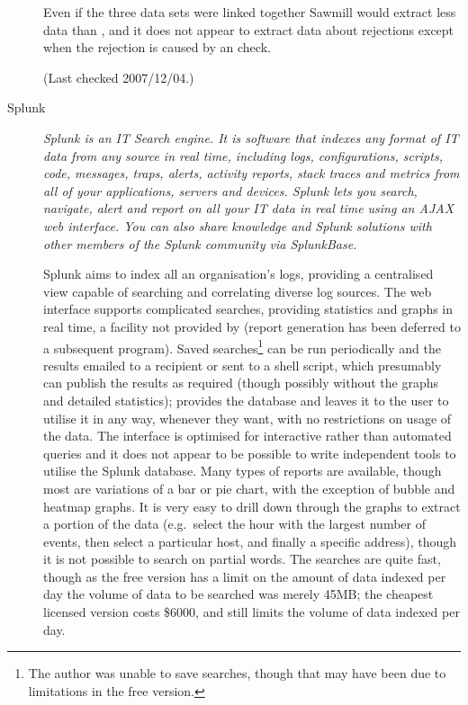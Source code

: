 \documentclass[a4paper,12pt,draft]{article}
\newcommand{\parsername}{\PLP{}}
\begin{document}
\begin{description}
        Even if the three data sets were linked together Sawmill would
        extract less data than \parsername{}, and it does not appear to
        extract data about rejections except when the rejection is caused
        by an \RBL{} check.

        (Last checked 2007/12/04.)

    \item [Splunk] \textit{Splunk is an IT Search engine. It is software
        that indexes any format of IT data from any source in real time,
        including logs, configurations, scripts, code, messages, traps,
        alerts, activity reports, stack traces and metrics from all of your
        applications, servers and devices. Splunk lets you search,
        navigate, alert and report on all your IT data in real time using
        an AJAX web interface. You can also share knowledge and Splunk
        solutions with other members of the Splunk community via
        SplunkBase.\/}

        Splunk aims to index all an organisation's logs, providing a
        centralised view capable of searching and correlating diverse log
        sources.  The web interface supports complicated searches,
        providing statistics and graphs in real time, a facility not
        provided by \parsername{} (report generation has been deferred to a
        subsequent program).  Saved searches\footnote{The author was unable
        to save searches, though that may have been due to limitations in
        the free version.} can be run periodically and the results emailed
        to a recipient or sent to a shell script, which presumably can
        publish the results as required (though possibly without the graphs
        and detailed statistics); \parsername{} provides the database and
        leaves it to the user to utilise it in any way, whenever they want,
        with no restrictions on usage of the data.  The interface is
        optimised for interactive rather than automated queries and it does
        not appear to be possible to write independent tools to utilise the
        Splunk database.  Many types of reports are available, though most
        are variations of a bar or pie chart, with the exception of bubble
        and heatmap graphs.  It is very easy to drill down through the
        graphs to extract a portion of the data (e.g.\ select the hour with
        the largest number of events, then select a particular host, and
        finally a specific address), though it is not possible to search on
        partial words.  The searches are quite fast, though as the free
        version has a limit on the amount of data indexed per day the
        volume of data to be searched was merely 45MB\@; the cheapest
        licensed version costs \$6000, and still limits the volume of data
        indexed per day.


\end{description}
\end{document}
